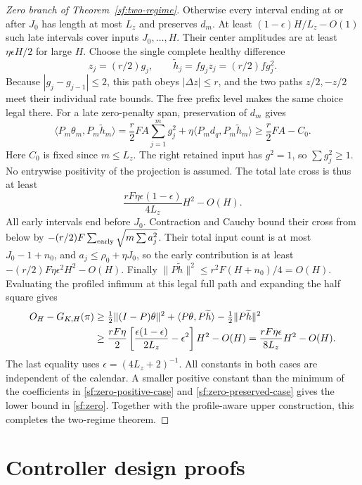 \begin{proof}[Zero branch of Theorem~\ref{sf:two-regime}]
Otherwise every interval ending at or after $J_0$ has length
at most $L_z$ and preserves $d_m$.
At least $(1-\epsilon)H/L_z-O(1)$ such late intervals cover
inputs $J_0,\ldots,H$. Their center amplitudes are at least
$\eta\epsilon H/2$ for large $H$.
Choose the single complete healthy difference
\[
z_j=(r/2)g_j,\qquad \widetilde h_j=fg_jz_j=(r/2)fg_j^2 .
\]
Because $|g_j-g_{j-1}|\le2$, this path obeys $|\Delta z|\le r$,
and the two paths $z/2,-z/2$ meet their individual rate bounds.
The free prefix level makes the same choice legal there.
For a late zero-penalty span, preservation of $d_m$ gives
\[
\langle P_m\theta_m,P_m\widetilde h_m\rangle
=\frac r2FA\sum_{j=1}^m g_j^2+
 \eta\langle P_md_q,P_m\widetilde h_m\rangle
\ge \frac r2FA-C_0 .
\]
Here $C_0$ is fixed since $m\le L_z$.
The right retained input has $g^2=1$, so $\sum g_j^2\ge1$.
No entrywise positivity of the projection is assumed.
The total late cross is thus at least
\[
\frac{rF\eta\epsilon(1-\epsilon)}{4L_z}H^2-O(H).
\]
All early intervals end before $J_0$.
Contraction and Cauchy bound their cross from below by
$-(r/2)F\sum_{\rm early}\sqrt{m\sum a_j^2}$.
Their total input count is at most $J_0-1+n_0$, and
$a_j\le\rho_0+\eta J_0$, so the early contribution is at least
$-(r/2)F\eta\epsilon^2H^2-O(H)$.
Finally $\|P\widetilde h\|^2\le r^2F(H+n_0)/4=O(H)$.
Evaluating the profiled infimum at this legal full path and expanding
the half square gives
\begin{align}
O_H-G_{K,H}(\pi)
&\ge \tfrac12\|(I-P)\theta\|^2+
 \langle P\theta,P\widetilde h\rangle-
 \tfrac12\|P\widetilde h\|^2 \notag\\
&\ge \frac{rF\eta}{2}
 \left[\frac{\epsilon(1-\epsilon)}{2L_z}-\epsilon^2\right]H^2-O(H)
 =\frac{rF\eta\epsilon}{8L_z}H^2-O(H).
\label{sf:zero-preserved-case}
\end{align}
The last equality uses $\epsilon=(4L_z+2)^{-1}$.
All constants in both cases are independent of the calendar.
A smaller positive constant than the minimum of the coefficients
in \eqref{sf:zero-positive-case} and \eqref{sf:zero-preserved-case}
gives the lower bound in \eqref{sf:zero}.
Together with the profile-aware upper construction, this completes
the two-regime theorem.
\end{proof}

\section{Controller design proofs}\label{sf:control-proofs}

